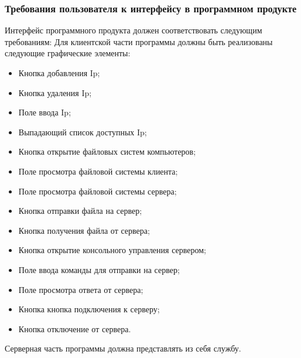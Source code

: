 \subsubsection{Требования пользователя к интерфейсу в программном продукте}
Интерфейс программного продукта должен соответствовать следующим требованиям:
Для клиентской части программы должны быть реализованы следующие графические элементы:
\begin{itemize}
	\item Кнопка добавления Ip;
	\item Кнопка удаления Ip;
	\item Поле ввода Ip;
	\item Выпадающий список доступных Ip;
	\item Кнопка открытие файловых систем компьютеров;
	\item Поле просмотра файловой системы клиента;
	\item Поле просмотра файловой системы сервера;
	\item Кнопка отправки файла на сервер;
	\item Кнопка получения файла от сервера;
	\item Кнопка открытие консольного управления сервером;
	\item Поле ввода команды для отправки на сервер;
	\item Поле просмотра ответа от сервера;
	\item Кнопка кнопка подключения к серверу;
	\item Кнопка отключение от сервера.
\end{itemize}
Серверная часть программы должна представлять из себя службу.

